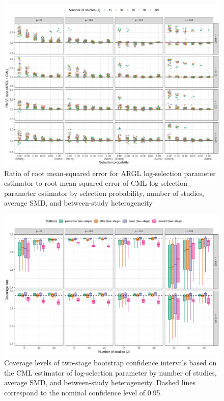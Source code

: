 \documentclass[
  american,
  man, donotrepeattitle,floatsintext]{apa7}
\begin{document}
\begin{figure}
\includegraphics{step-function-selection-models-with-dependent-effects_files/figure-latex/selection-rmse-ARGL-CML-1} \caption{Ratio of root mean-squared error for ARGL log-selection parameter estimator to root mean-squared error of CML log-selection parameter estimator by selection probability, number of studies, average SMD, and between-study heterogeneity}\label{fig:selection-rmse-ARGL-CML}
\end{figure}

\begin{figure}
\includegraphics{step-function-selection-models-with-dependent-effects_files/figure-latex/CML-zeta-coverage-two-stage-1} \caption{Coverage levels of two-stage bootstrap confidence intervals based on the CML estimator of log-selection parameter by number of studies, average SMD, and between-study heterogeneity. Dashed lines correspond to the nominal confidence level of 0.95.}\label{fig:CML-zeta-coverage-two-stage}
\end{figure}
\end{document}
